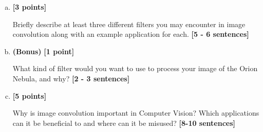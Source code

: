 \documentclass[11pt]{article}
\begin{document}
\begin{enumerate}[(a)]
\begin{enumerate}[(i)]
\begin{tcolorbox}[colback=white!5!white,colframe=green!75!black]
{{        %
        }}
\end{tcolorbox}
    
\end{enumerate}


\item \textbf{[3 points]} 
\begin{tcolorbox}[colback=orange!5!white,colframe=orange!75!black]
Briefly describe at least three different filters you may encounter in image convolution along with an example application for each. \textbf{[5 - 6 sentences]}
\end{tcolorbox}


\item \textbf{(Bonus)} \textbf{[1 point]}
\begin{tcolorbox}[colback=blue!5!white,colframe=blue!75!black]
What kind of filter would you want to use to process your image of the Orion Nebula, and why? \textbf{[2 - 3 sentences]}
\end{tcolorbox}

\pagebreak

\item \textbf{[5 points]} 
\begin{tcolorbox}[colback=orange!5!white,colframe=orange!75!black]
Why is image convolution important in Computer Vision? Which applications can it be beneficial to and where can it be misused? \textbf{[8-10 sentences]}
\end{tcolorbox}


\end{enumerate}
\end{document}
